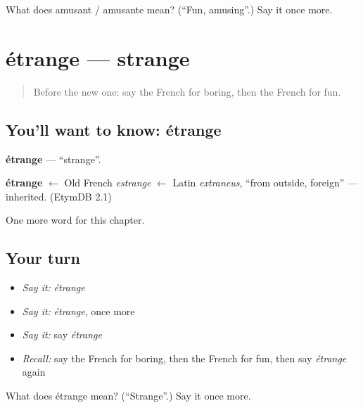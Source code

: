 \begin{tcolorbox}[breakable,colback=teal!4,colframe=teal!35!black,title={Before you move on}]
What does amusant / amusante mean? (\textquotedblleft{}Fun, amusing\textquotedblright{}.) Say it once more.
\end{tcolorbox}
\section[étrange]{étrange — strange}

\label{lesson:FR-C219-etrange}



\begin{quote}
Before the new one: say the French for boring, then the French for fun.
\end{quote}

\subsection*{You'll want to know: étrange}
\textbf{étrange} — \textquotedblleft{}strange\textquotedblright{}.

\begin{cousinweb}
\textbf{étrange} $\leftarrow$ Old French \emph{estrange} $\leftarrow$ Latin \emph{extraneus}, \textquotedblleft{}from outside, foreign\textquotedblright{} — inherited. (EtymDB 2.1)
\end{cousinweb}

\begin{grammarlens}[title={What you've built}]
One more word for this chapter.
\end{grammarlens}

\subsection*{Your turn}
\begin{itemize}
\raggedright
  \item \emph{Say it:} \emph{étrange}
  \item \emph{Say it:} \emph{étrange}, once more
  \item \emph{Say it:} say \emph{étrange}
  \item \emph{Recall:} say the French for boring, then the French for fun, then say \emph{étrange} again
\end{itemize}

\begin{tcolorbox}[breakable,colback=teal!4,colframe=teal!35!black,title={Before you move on}]
What does étrange mean? (\textquotedblleft{}Strange\textquotedblright{}.) Say it once more.
\end{tcolorbox}
